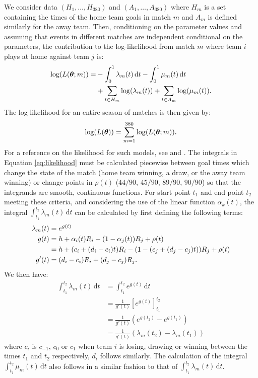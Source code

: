 We consider data \((H_1, \ldots, H_{380})\) and \((A_1, \ldots, A_{380})\) where \(H_m\) is a set containing the times
of the home team goals in match \(m\) and \(A_m\) is defined similarly for the away team. Then, conditioning on the
parameter values and assuming that events in different matches are independent conditional on the parameters, the
contribution to the log-likelihood from match \(m\) where team \(i\) plays at home against team \(j\) is:
\begin{equation}
\begin{split}
\log(L(\boldsymbol{\theta}; m)) = &-\int_{0}^{1} \lambda_m(t) \, \mathrm{d}t - \int_{0}^{1} \mu_m(t) \, \mathrm{d}t\\ 
  					     &+\sum_{t \in H_m} \log(\lambda_m(t)) + \sum_{t \in A_m} \log(\mu_m(t)).
\label{eq:likelihood}
\end{split}
\end{equation}
The log-likelihood for an entire season of matches is then given by:
\begin{align}
\log(L(\boldsymbol{\theta})) = \sum_{m=1}^{380} \log(L(\boldsymbol{\theta}; m)).
\end{align}
For a reference on the likelihood for such models, see \cite{cox1966} and \cite{DixonRobinson1998}. The integrals in
Equation \eqref{eq:likelihood} must be calculated piecewise between goal times which change the state of the match (home
team winning, a draw, or the away team winning) or change-points in \(\rho(t)\) (\(44/90\), \(45/90\), \(89/90\),
\(90/90\)) so that the integrands are smooth, continuous functions. For start point \(t_1\) and end point \(t_2\)
meeting these criteria, and considering the use of the linear function \(\alpha_k(t)\), the integral \(\int_{t_1}^{t_2}
\lambda_m(t) \, \mathrm{d}t\) can be calculated by first defining the following terms:
\begin{align} 
\lambda_m(t) &= e^{g(t)} \\
g(t)  &= h + \alpha_i(t) R_i - (1 - \alpha_j(t)) R_j + \rho(t) \notag\\
      &= h + (c_i + (d_i - c_i)t) R_i - (1 - (c_j + (d_j - c_j)t)) R_j + \rho(t) \\
g'(t) &= (d_i - c_i) R_i + (d_j - c_j)R_j.
\end{align}
We then have:
\begin{align} 
\int_{t_1}^{t_2} \lambda_m(t) \, \mathrm{d}t &= \int_{t_1}^{t_2} e^{g(t)} \, \mathrm{d}t \\
										     &= \frac{1}{g'(t)} \left[ e^{g(t)} \right]_{t_1}^{t_2} \\
										     &= \frac{1}{g'(t)} (e^{g(t_2)} - e^{g(t_1)}) \\
										     &= \frac{1}{g'(t)} (\lambda_m(t_2) - \lambda_m(t_1))
\end{align}
where \(c_i\) is \(c_{-1}\), \(c_0\) or \(c_1\) when team \(i\) is losing, drawing or winning between the times \(t_1\)
and \(t_2\) respectively, \(d_i\) follows similarly. The calculation of the integral \(\int_{t_1}^{t_2} \mu_m(t) \,
\mathrm{d}t\) also follows in a similar fashion to that of \(\int_{t_1}^{t_2} \lambda_m(t) \, \mathrm{d}t\).


